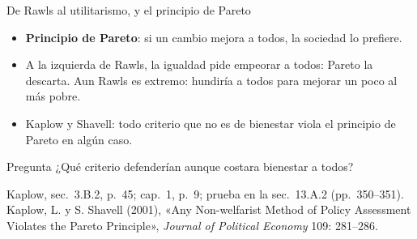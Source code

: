 \documentclass[aspectratio=169,11pt]{beamer}
\newcommand{\fuente}[1]{\par\vfill{\small\color{cGris}#1\par}}
\begin{document}
\begin{frame}{De Rawls al utilitarismo, y el principio de Pareto}
  \centering
  \par\smallskip\raggedright
  \begin{itemize}
    \item \textbf{Principio de Pareto}: si un cambio mejora a todos, la sociedad lo prefiere.
    \item A la izquierda de Rawls, la igualdad pide empeorar a todos: Pareto la descarta. Aun Rawls es extremo: hundiría a todos para mejorar un poco al más pobre.
    \pause
    \item Kaplow y Shavell: todo criterio que no es de bienestar viola el principio de Pareto en algún caso.
  \end{itemize}
  \pause
  \begin{alertblock}{Pregunta}
    ¿Qué criterio defenderían aunque costara bienestar a todos?
  \end{alertblock}
  \fuente{Kaplow, sec.~3.B.2, p.~45; cap.~1, p.~9; prueba en la sec.~13.A.2 (pp.~350--351). Kaplow, L. y S. Shavell (2001), «Any Non-welfarist Method of Policy Assessment Violates the Pareto Principle», \emph{Journal of Political Economy} 109: 281--286.}
\end{frame}
\end{document}
